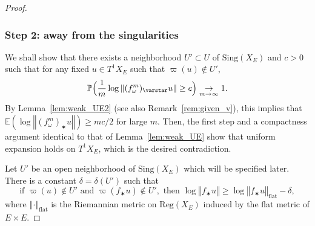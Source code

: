 \documentclass[JEP,XML,SOM,Unicode,published]{cedram}
\newcommand{\norm}[1]{{\left\Vert#1\right\Vert}}
\newcommand{\unsur}[1]{\frac{1}{#1}}
\newcommand{\lrpar}[1]{\left(#1\right)}
\newcommand{\Blrpar}[1]{\Bigl(#1\Bigr)}
\newcommand{\ee}{\mathbb{E}}
\newcommand{\pp}{\mathbb{P}}\let\P\pp
\newcommand{\Sing}{{\mathrm{Sing}}}
\theoremstyle{plain}
\theoremstyle{definition}
\begin{document}
\begin{proof}
\subsubsection*{Step 2: away from the singularities}
We shall show that there exists a neighborhood $U'\subset U$ of $\Sing(X_E)$
and $c>0$ such that
for any fixed $u\in T^1X_E$ such that $\varpi(u)\notin U'$,
\begin{equation}\label{eq:UE_proba}
\pp\Blrpar{\unsur{m}\log \norm{(f_\omega^m)_\varstar u} \geq c} \underset{m\to\infty}{\to} 1.
\end{equation}
By Lemma~\ref{lem:weak_UE2} (see also Remark~\ref{rem:given_v}), this implies that
$\ee\lrpar{\log \norm{(f_\omega^m)_\varstar u}}\geq mc/2$ for large $m$. Then, the first step and
a compactness argument identical to that of
Lemma~\ref{lem:weak_UE} show that uniform expansion holds on $T^1X_E$,
which is the desired contradiction.

Let $U'$ be an open neighborhood of $\Sing(X_E)$ which will be specified later.
There is a constant $\delta = \delta(U')$ such that
\begin{equation}\label{eq:flat1}
\text{if } \varpi(u)\notin U'\text{ and } \varpi(f_\varstar u)\notin U', \text{ then }
\log\norm{f_\varstar u} \geq \log\norm{f_\varstar u}_{\mathrm{flat}} - \delta,
\end{equation}
where $\norm{\cdot}_{\mathrm{flat}}$ is the Riemannian metric on $\mathrm{Reg}(X_E)$ induced by the flat metric of
$E\times E$.


\end{proof}
\end{document}
